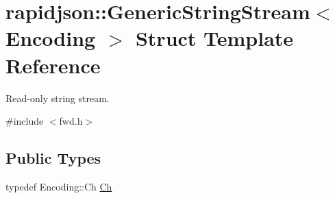 \hypertarget{structrapidjson_1_1_generic_string_stream}{}\section{rapidjson\+::Generic\+String\+Stream$<$ Encoding $>$ Struct Template Reference}
\label{structrapidjson_1_1_generic_string_stream}


Read-\/only string stream.  




{\ttfamily \#include $<$fwd.\+h$>$}

\subsection*{Public Types}
\begin{DoxyCompactItemize}
\item 
typedef Encoding\+::\+Ch \mbox{\hyperlink{structrapidjson_1_1_generic_string_stream_a70ad06c96ddf8349be59f3d4f6bbadc8}{Ch}}
\end{DoxyCompactItemize}
